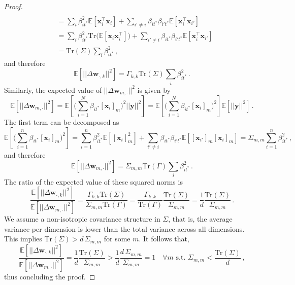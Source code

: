 \begin{proof}
\begin{equation}
\begin{split}
\\
&= \sum_i\beta^2_{it^*}\mathbb{E}\left[\bm{x}^\top_{i}\bm{x}_{i}\right] +
\sum_{i'\neq i}\beta_{it^*}\beta_{i't^*}\mathbb{E}\left[\bm{x}^\top_{i}\bm{x}_{i'}\right]
\\
& =
\sum_i\beta^2_{it^*}\text{Tr}\big(\mathbb{E}\left[\bm{x}_{i}\bm{x}_{i}^\top\right]\big) +
\sum_{i'\neq i}\beta_{it^*}\beta_{i't^*}\mathbb{E}\left[\bm{x}^\top_{i}\bm{x}_{i'}\right] 
\\
& = \text{Tr}(\Sigma)\sum_i\beta^2_{it^*} \,,
\end{split}
\end{equation}
%
and therefore
%
\begin{equation}
    \mathbb{E}\left[ ||\Delta \bm{w}_{\cdot, k}||^2 \right] = \Gamma_{k,k}\text{Tr} (\Sigma)\sum_i\beta^2_{it^*} \,.
\end{equation}
%
Similarly, the expected value of $||\Delta \bm{w}_{m, \cdot}||^2$ is given by
%
\begin{equation}
\mathbb{E}\left[ ||\Delta \bm{w}_{m, \cdot}||^2 \right] 
= 
\mathbb{E}\left[\big(\sum_{i=1}^N\beta_{it^*}[\bm{x}_i]_m\big)^2 ||  \bm{y}||^2
\right]
= 
\mathbb{E}\left[ \big(\sum_{i=1}^N\beta_{it^*}[\bm{x}_i]_m\big)^2 \right] \mathbb{E}\left[ ||  \bm{y}||^2\right]\,.
\end{equation}
%
The first term can be decomposed as
%
\begin{equation}
\mathbb{E}\left[ \big(\sum_{i=1}^n\beta_{it^*}[\bm{x}_i]_m\big)^2 \right]  =
\sum_{i=1}^n \beta^2_{it^*}\mathbb{E}\left[[\bm{x}_i]_m^2 \right]  + \sum_{i' \neq i}\beta_{it^*}\beta_{i't^*}\mathbb{E}\left[ [\bm{x}_{i'}]_m [\bm{x}_{i}]_m \right] =  \Sigma_{m,m}\sum_{i=1}^n\beta^2_{it^*} \,,
\end{equation}
%
and therefore
%
\begin{equation}
\mathbb{E}\left[ ||\Delta \bm{w}_{m, \cdot}||^2 \right] = \Sigma_{m,m}\text{Tr}(\Gamma)\sum_i\beta^2_{it^*}\,.
\end{equation}
%
The ratio of the expected value of these squared norms is
%
\begin{equation}
\frac{\mathbb{E}\left[ ||\Delta \bm{w}_{\cdot, k}||^2 \right]}{\mathbb{E}\left[ ||\Delta \bm{w}_{m, \cdot}||^2 \right]} = \frac{ \Gamma_{k,k}\text{Tr}(\Sigma)}{ \Sigma_{m,m}\text{Tr}(\Gamma)} = \frac{\Gamma_{k,k}}{\text{Tr}(\Gamma)}\frac{\text{Tr}(\Sigma)}{\Sigma_{m,m}} = \frac{1}{d}\frac{\text{Tr}(\Sigma)}{\Sigma_{m,m}} \,.
\end{equation}
%
We assume a non-isotropic covariance structure in $\Sigma$, that is, the average variance per dimension is lower than the total variance across all dimensions.
%
This implies $\text{Tr}(\Sigma) > d\,\Sigma_{m,m}$ for some $m$.
%
It follows that,
%
\begin{equation}
\frac{\mathbb{E}\left[ ||\Delta \bm{w}_{\cdot, k}||^2 \right]}{\mathbb{E}\left[ ||\Delta \bm{w}_{m, \cdot}||^2 \right]} = \frac{1}{d}\frac{\text{Tr}(\Sigma)}{\Sigma_{m,m}}  > \frac{1}{d}\frac{d \,\Sigma_{m,m}}{\Sigma_{m,m}} = 1 \quad \forall m \,\,\text{s.t.}\,\,\Sigma_{m,m} < \frac{\text{Tr}(\Sigma)}{d}\,,
\end{equation}
%
thus concluding the proof.
%
\end{proof}